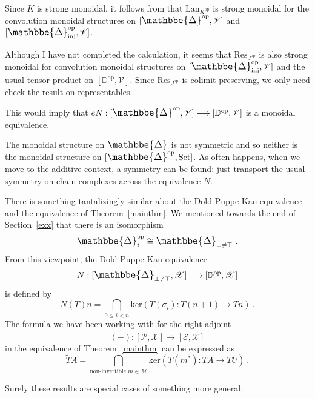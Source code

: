 \documentclass[a4paper,12pt,reqno]{amsart}
\def\makebigger#1#2#3{\hbox{#1$\mathsurround=0pt #2{#3}$}}
\def\bigger#1#2{{\relax\mathpalette{\makebigger#1}{#2}}}
\newcommand{\DelCat}{{\bigger\large{\mathbbe{\Delta}}}}
\theoremstyle{definition}
\theoremstyle{fact}
\theoremstyle{genquest}
\theoremstyle{step}
\newcommand{\lra}{\longrightarrow}
\def\CE{{\mathscr E}}
\def\CM{{\mathscr M}}
\def\CP{{\mathscr P}}
\def\CV{{\mathscr V}}
\def\CX{{\mathscr X}}
\begin{document}
Since $K$ is strong monoidal, it follows from \cite{DaySt1995} that
$\mathrm{Lan}_{K^{\mathrm{op}}}$ is strong monoidal for the convolution
monoidal structures on $[\DelCat^{\mathrm{op}},\CV]$ and  $[\DelCat_{\mathrm{inj}}^{\mathrm{op}},\CV]$.   

Although I have not completed the calculation, it seems that 
$\mathrm{Res}_{J^{\mathrm{op}}}$ is also strong monoidal for convolution
monoidal structures on $[\DelCat_{\mathrm{inj}}^{\mathrm{op}},\CV]$
and the usual tensor product on $[\mathbb{D}^{\mathrm{op}},\CV] $. 
Since $\mathrm{Res}_{J^{\mathrm{op}}}$ is colimit preserving, we
only need check the result on representables.   

This would imply that $eN : [\DelCat^{\mathrm{op}},\CV]\lra [\mathbb{D}^{\mathrm{op}},\CV]$ is a monoidal equivalence. 

The monoidal structure on $\DelCat$ is not symmetric and so neither is the
monoidal structure on $[\DelCat^{\mathrm{op}},\mathrm{Set}]$.
As often happens, when we move to the additive context, a symmetry can be
found: just transport the usual symmetry on chain complexes across the equivalence $N$. 

There is something tantalizingly similar about the Dold-Puppe-Kan equivalence and the equivalence of Theorem~\ref{mainthm}.
We mentioned towards the end of Section~\ref{exx} that there is
an isomorphism
$$\DelCat_{\mathrm{t}}^{\mathrm{op}} \cong \DelCat_{\bot \neq \top} \ .$$  
From this viewpoint, the Dold-Puppe-Kan equivalence 
$$N : [\DelCat_{\bot \neq \top},\CX] \lra [\mathbb{D}^{\mathrm{op}},\CX]$$
is defined by
$$N(T)n = \bigcap_{0\le i < n}{\mathrm{ker}(T(\sigma_i) : T(n+1)\lra Tn)} \ .$$
The formula we have been working with for the right adjoint
$$\widetilde{(-)} : [\CP, \CX] \lra [\CE, \CX]$$
in the equivalence of Theorem~\ref{mainthm} can be expressed as
$$\widetilde{T}A = \bigcap_{\text{non-invertible }m\in \CM}{\mathrm{ker}( T(m^*) : TA\lra TU)} \ .$$  

Surely these results are special cases of something more general.  
\end{document}
